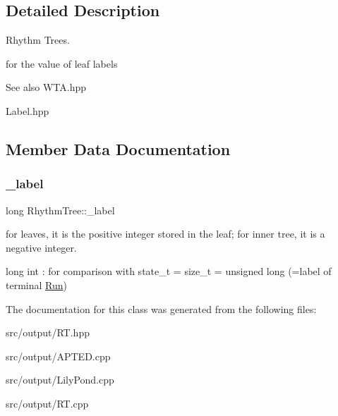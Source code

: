 \subsection{Detailed Description}
Rhythm Trees. 

for the value of leaf labels \begin{DoxySeeAlso}{See also}
W\+T\+A.\+hpp 

Label.\+hpp 
\end{DoxySeeAlso}


\subsection{Member Data Documentation}
\mbox{\label{classRhythmTree_a172a0c68e4b6adace9c025c9159040e2}} 
\subsubsection{\texorpdfstring{\_label}{\_label}}
{\footnotesize\ttfamily long Rhythm\+Tree\+::\+\_\+label\hspace{0.3cm}{\ttfamily [protected]}}



for leaves, it is the positive integer stored in the leaf; for inner tree, it is a negative integer. 

long int \+: for comparison with state\+\_\+t = size\+\_\+t = unsigned long (=label of terminal \mbox{\hyperlink{classRun}{Run}}) 

The documentation for this class was generated from the following files\+:\begin{DoxyCompactItemize}
\item 
src/output/R\+T.\+hpp\item 
src/output/A\+P\+T\+E\+D.\+cpp\item 
src/output/Lily\+Pond.\+cpp\item 
src/output/R\+T.\+cpp\end{DoxyCompactItemize}
